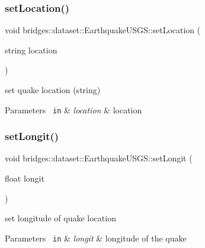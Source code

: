 \subsubsection{\texorpdfstring{setLocation()}{setLocation()}}
{\footnotesize\ttfamily void bridges\+::dataset\+::\+Earthquake\+U\+S\+G\+S\+::set\+Location (\begin{DoxyParamCaption}\item[{string}]{location }\end{DoxyParamCaption})\hspace{0.3cm}{\ttfamily [inline]}}



set quake location (string) 


\begin{DoxyParams}[1]{Parameters}
\mbox{\texttt{ in}}  & {\em location} & location \\
\hline
\end{DoxyParams}
\mbox{\label{classbridges_1_1dataset_1_1_earthquake_u_s_g_s_a80ceea5c1ae15e7fd075ded145a14779}} 
\subsubsection{\texorpdfstring{setLongit()}{setLongit()}}
{\footnotesize\ttfamily void bridges\+::dataset\+::\+Earthquake\+U\+S\+G\+S\+::set\+Longit (\begin{DoxyParamCaption}\item[{float}]{longit }\end{DoxyParamCaption})\hspace{0.3cm}{\ttfamily [inline]}}



set longitude of quake location 


\begin{DoxyParams}[1]{Parameters}
\mbox{\texttt{ in}}  & {\em longit} & longitude of the quake \\
\hline
\end{DoxyParams}
\mbox{\label{classbridges_1_1dataset_1_1_earthquake_u_s_g_s_ab961fcafd63f3ec0626ff38e2c4c01cd}} 
